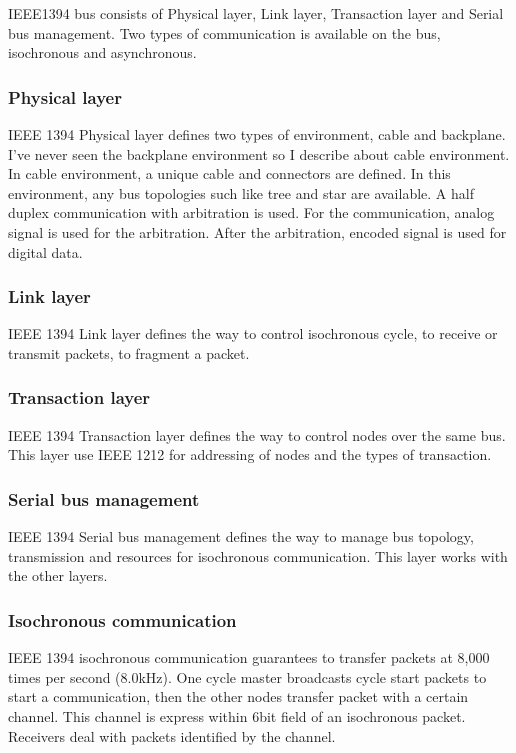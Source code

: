 \documentclass[onecolumn]{article}
\begin{document}
IEEE1394 bus consists of Physical layer, Link layer, Transaction layer and Serial bus management. Two types of communication is available on the bus, isochronous and asynchronous.

\subsubsection{Physical layer}
IEEE 1394 Physical layer defines two types of environment, cable and backplane. I've never seen the backplane environment so I describe about cable environment. In cable environment, a unique cable and connectors are defined. In this environment, any bus topologies such like tree and star are available. A half duplex communication with arbitration is used. For the communication, analog signal is used for the arbitration. After the arbitration, encoded signal is used for digital data.


\subsubsection{Link layer}
IEEE 1394 Link layer defines the way to control isochronous cycle, to receive or transmit packets, to fragment a packet.


\subsubsection{Transaction layer}
IEEE 1394 Transaction layer defines the way to control nodes over the same bus. This layer use IEEE 1212 for addressing of nodes and the types of transaction.

\subsubsection{Serial bus management}
IEEE 1394 Serial bus management defines the way to manage bus topology, transmission and resources for isochronous communication. This layer works with the other layers.

\subsubsection{Isochronous communication}
IEEE 1394 isochronous communication guarantees to transfer packets at 8,000 times per second (8.0kHz). One cycle master broadcasts cycle start packets to start a communication, then the other nodes transfer packet with a certain channel. This channel is express within 6bit field of an isochronous packet. Receivers deal with packets identified by the channel.
\end{document}
